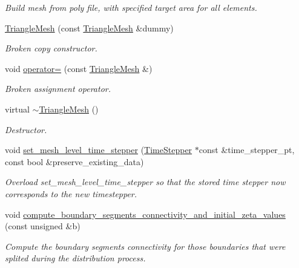 \begin{DoxyCompactItemize}
\begin{DoxyCompactList}\small\item\em Build mesh from poly file, with specified target area for all elements. \end{DoxyCompactList}\item 
\hyperlink{classoomph_1_1TriangleMesh_a2a6d680ea50dca34788f4f0c480d9d75}{Triangle\+Mesh} (const \hyperlink{classoomph_1_1TriangleMesh}{Triangle\+Mesh} \&dummy)
\begin{DoxyCompactList}\small\item\em Broken copy constructor. \end{DoxyCompactList}\item 
void \hyperlink{classoomph_1_1TriangleMesh_a246acfb459ba11cc8b21132ace403e3c}{operator=} (const \hyperlink{classoomph_1_1TriangleMesh}{Triangle\+Mesh} \&)
\begin{DoxyCompactList}\small\item\em Broken assignment operator. \end{DoxyCompactList}\item 
virtual \hyperlink{classoomph_1_1TriangleMesh_a1b3d8cb528c25a53faa38164600f256d}{$\sim$\+Triangle\+Mesh} ()
\begin{DoxyCompactList}\small\item\em Destructor. \end{DoxyCompactList}\item 
void \hyperlink{classoomph_1_1TriangleMesh_abb1a6cb242b5d0e067a8e64b3ac50cfb}{set\+\_\+mesh\+\_\+level\+\_\+time\+\_\+stepper} (\hyperlink{classoomph_1_1TimeStepper}{Time\+Stepper} $\ast$const \&time\+\_\+stepper\+\_\+pt, const bool \&preserve\+\_\+existing\+\_\+data)
\begin{DoxyCompactList}\small\item\em Overload set\+\_\+mesh\+\_\+level\+\_\+time\+\_\+stepper so that the stored time stepper now corresponds to the new timestepper. \end{DoxyCompactList}\item 
void \hyperlink{classoomph_1_1TriangleMesh_a18322e3238acaf2c0d3c473b5fac4c91}{compute\+\_\+boundary\+\_\+segments\+\_\+connectivity\+\_\+and\+\_\+initial\+\_\+zeta\+\_\+values} (const unsigned \&b)
\begin{DoxyCompactList}\small\item\em Compute the boundary segments connectivity for those boundaries that were splited during the distribution process. \end{DoxyCompactList}\item 

\end{DoxyCompactItemize}
